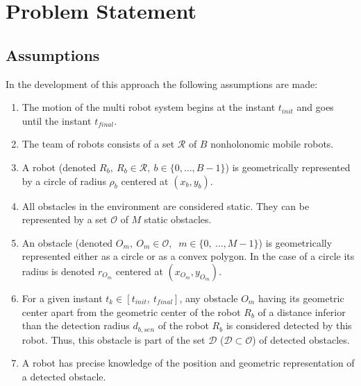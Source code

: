 \documentclass[eprint]{actapoly}
\begin{document}
\newpage
\mbox{}\newpage

\section{Problem Statement}

\subsection{Assumptions}
In the development of this approach the following assumptions are made:

\begin{enumerate}

    \item The motion of the multi robot system begins at
    the instant $t_{init}$ and goes until the instant $t_{final}$.

    \item The team of robots consists of a set $\mathcal{R}$ of $B$
    nonholonomic mobile robots.
    
    \item A robot (denoted $R_b,\ R_b \in \mathcal{R},\ b \in \{0,\dots,B-1\}$) is 
    geometrically represented by a circle of radius $\rho_b$ centered at $(x_b, y_b)$.
        
    \item All obstacles in the environment are considered static. They can be
    represented by a set $\mathcal{O}$ of $M$ static obstacles.
    
    \item An obstacle (denoted $O_m,\ $\mbox{$O_m \in \mathcal{O}$}$,\ $
    \mbox{$m \in \{0,\ \dots, M-1\}$}) is geometrically represented either as
    a circle or as a convex polygon. In the case of a circle its radius is
    denoted $r_{O_m}$ centered at $(x_{O_m},y_{O_m})$.
    
    \item For a given instant $t_k \in [t_{init},\ t_{final}]$, any obstacle
    $O_m$ having its geometric center apart from the geometric center of the
    robot $R_b$ of a distance inferior than the detection radius $d_{b,sen}$
    of the robot $R_b$ is considered detected by this robot.
    Thus, this obstacle is part of the set $\mathcal{D}$
    ($\mathcal{D} \subset \mathcal{O}$) of detected obstacles.
    
    \item A robot has precise knowledge of the position and geometric representation of
    a detected obstacle.
    

\end{enumerate}
\end{document}
